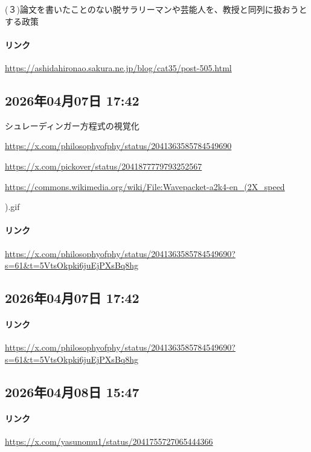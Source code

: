 \documentclass[facebook_diary.tex]{subfiles}
\begin{document}
(３)論文を書いたことのない脱サラリーマンや芸能人を、教授と同列に扱おうとする政策

\paragraph{リンク}
\url{https://ashidahironao.sakura.ne.jp/blog/cat35/post-505.html}

\subsection*{2026年04月07日 17:42}

シュレーディンガー方程式の視覚化


\url{https://x.com/philosophyofphy/status/2041363585784549690}




\url{https://x.com/pickover/status/2041877779793252567}




\url{https://commons.wikimedia.org/wiki/File:Wavepacket-a2k4-en_(2X_speed}

).gif

\paragraph{リンク}
\url{https://x.com/philosophyofphy/status/2041363585784549690?s=61&t=5VtsOkpki6juEjPXsBq8hg}

\subsection*{2026年04月07日 17:42}

\paragraph{リンク}
\url{https://x.com/philosophyofphy/status/2041363585784549690?s=61&t=5VtsOkpki6juEjPXsBq8hg}

\subsection*{2026年04月08日 15:47}

\paragraph{リンク}
\url{https://x.com/yasunomu1/status/2041755727065444366}
\end{document}

